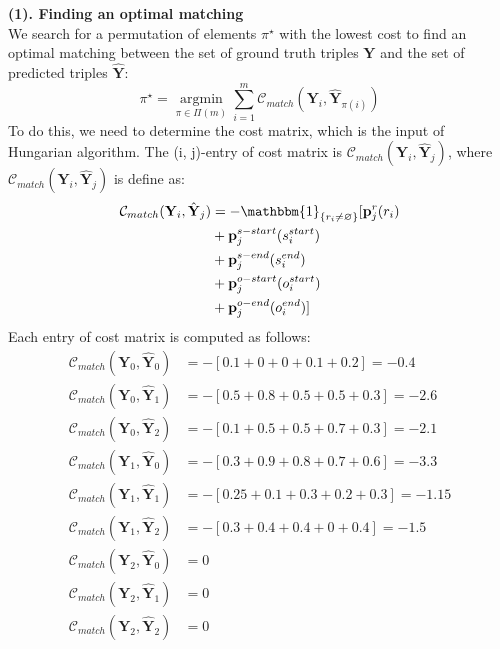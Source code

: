 \documentclass[letterpaper]{article} \usepackage{aaai21}  \usepackage{times}  \usepackage{helvet} \usepackage{courier}  \usepackage[hyphens]{url}  \usepackage{graphicx} \usepackage{amsfonts,amssymb}
\begin{document}
\noindent \textbf{(1). Finding an optimal matching} \\
\noindent We search for a permutation of elements $\pi^\star$ with the lowest cost to find an optimal matching between the set of ground truth triples $\mathbf{Y}$ and the set of predicted triples $\hat{\mathbf{Y}}$:
\begin{equation}
    \pi^\star = \mathop{\arg \min} \limits_{\pi \in \Pi(m)} \sum \limits_{i=1}^m \mathcal{C}_{match}(\mathbf{Y}_i, \hat{\mathbf{Y}}_{\pi(i)})  
    \label{assignment}
\end{equation}
To do this, we need to determine the cost matrix, which is the input of Hungarian algorithm. The (i, j)-entry of cost matrix is $\mathcal{C}_{match}(\mathbf{Y}_i, \hat{\mathbf{Y}}_{j})$, where $\mathcal{C}_{match}(\mathbf{Y}_i, \hat{\mathbf{Y}}_{j})$ is define as:
\begin{equation*}
\begin{split}
     \mathcal{C}_{match}(\mathbf{Y}_i, \hat{\mathbf{Y}}_{j})  &= - \mathbbm{1} _{\{r_i \neq \varnothing\}}[\mathbf{p}^r_{j}(r_i) \\
    & + \mathbf{p}^{s-start}_{j}(s_i^{start})\\
    &+ \mathbf{p}^{s-end}_{j}(s_i^{end})\\
    &   + \mathbf{p}^{o-start}_{j}(o_i^{start}) \\
    &+ \mathbf{p}^{o-end}_{j}(o_i^{end})]
\end{split}
\end{equation*}
Each entry of cost matrix is computed as follows: 
\begin{equation*}
\begin{split}
\mathcal{C}_{match}(\mathbf{Y}_0, \hat{\mathbf{Y}}_{0}) &= -[0.1+0+0+0.1+0.2] = -0.4\\
\mathcal{C}_{match}(\mathbf{Y}_0, \hat{\mathbf{Y}}_{1}) &= -[0.5+0.8+0.5+0.5+0.3] = -2.6\\
\mathcal{C}_{match}(\mathbf{Y}_0, \hat{\mathbf{Y}}_{2}) &= -[0.1+0.5+0.5+0.7+0.3] = -2.1\\
\mathcal{C}_{match}(\mathbf{Y}_1, \hat{\mathbf{Y}}_{0}) &= -[0.3+0.9+0.8+0.7+0.6] = -3.3\\
\mathcal{C}_{match}(\mathbf{Y}_1, \hat{\mathbf{Y}}_{1}) &= -[0.25+0.1+0.3+0.2+0.3] = -1.15\\
\mathcal{C}_{match}(\mathbf{Y}_1, \hat{\mathbf{Y}}_{2}) &= -[0.3+0.4+0.4+0+0.4] = -1.5\\
\mathcal{C}_{match}(\mathbf{Y}_2, \hat{\mathbf{Y}}_{0}) &= 0\\
\mathcal{C}_{match}(\mathbf{Y}_2, \hat{\mathbf{Y}}_{1}) &= 0\\
\mathcal{C}_{match}(\mathbf{Y}_2, \hat{\mathbf{Y}}_{2}) &= 0\\
\end{split}
\end{equation*}
\end{document}
